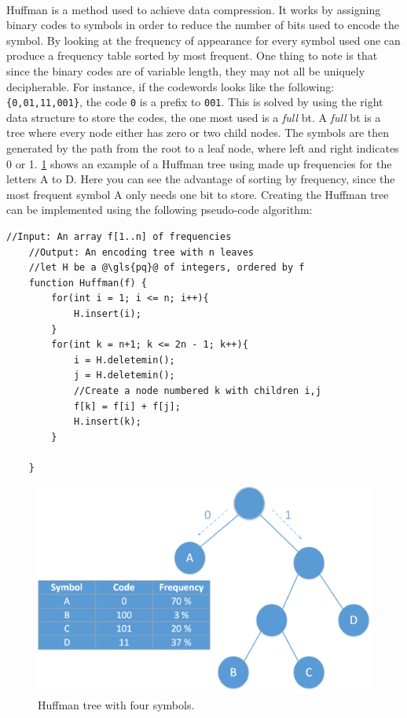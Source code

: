 \documentclass[a4paper, 12pt]{report}
\newcommand{\codeword}[1]{\texttt{#1}}
\begin{document}
\paragraph{}
Huffman is a method used to achieve data compression\cite{huffman}.
It works by assigning binary codes to symbols in order to reduce the number of bits used to encode the symbol.
By looking at the frequency of appearance for every symbol used one can produce a frequency table sorted by most frequent.
One thing to note is that since the binary codes are of variable length, they may not all be uniquely decipherable.
For instance, if the codewords looks like the following: \codeword{\{0,01,11,001\}}, the code \codeword{0} is a prefix to \codeword{001}.
This is solved by using the right data structure to store the codes, the one most used is a \textit{full} \gls{bt}.
A \textit{full} \gls{bt} is a tree where every node either has zero or two child nodes.
The symbols are then generated by the path from the root to a leaf node, where left and right indicates 0 or 1.
\ref{fig:hm-ex} shows an example of a Huffman tree using made up frequencies for the letters A to D.
Here you can see the advantage of sorting by frequency, since the most frequent symbol A only needs one bit to store.
Creating the Huffman tree can be implemented using the following pseudo-code algorithm:

\begin{lstlisting}[caption=Huffman algorithm \cite{algorithms}, label=lst:huffman]
	//Input: An array f[1..n] of frequencies
	//Output: An encoding tree with n leaves
	//let H be a @\gls{pq}@ of integers, ordered by f
	function Huffman(f) {
		for(int i = 1; i <= n; i++){
			H.insert(i);
		}
		for(int k = n+1; k <= 2n - 1; k++){
			i = H.deletemin();
			j = H.deletemin();
			//Create a node numbered k with children i,j
			f[k] = f[i] + f[j];
			H.insert(k);
		}

	}
\end{lstlisting}

\begin{figure}[h!]
	\centering
		\includegraphics[width=1.0\textwidth]{images/huffman.png}
		\caption{Huffman tree with four symbols.}
		\label{fig:hm-ex}
\end{figure}
\end{document}
